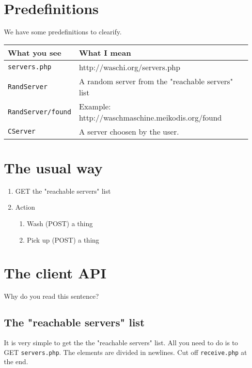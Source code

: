 \documentclass[letterpaper,twoside]{scrartcl}
\begin{document}
 \section{Predefinitions}
  We have some predefinitions to clearify.
  \newline

  \begin{tabular}[ht]{|l|l|}
   \hline
   \textbf{What you see} & \textbf{What I mean}\\
   \hline\hline
   \texttt{servers.php} & http://waschi.org/servers.php\\
   \hline
   \texttt{RandServer} & A random server from the "reachable servers" list\\
   \hline
   \texttt{RandServer/found} & Example: http://waschmaschine.meikodis.org/found\\
   \hline
   \texttt{CServer} & A server choosen by the user.\\
   \hline
  \end{tabular}
  \newline



 \section{The usual way}
  \begin{enumerate}
   \item GET the "reachable servers" list
   \item Action
   \begin{enumerate}
    \item Wash (POST) a thing
    \item Pick up (POST) a thing
   \end{enumerate}
  \end{enumerate}


 \newpage



 \section{The client API}
  Why do you read this sentence?

  \subsection{The "reachable servers" list}
   It is very simple to get the the "reachable servers" list. 
   All you need to do is to GET \texttt{servers.php}. 
   The elements are divided in newlines. 
   Cut off \texttt{receive.php} at the end. 
   \newline
\end{document}
